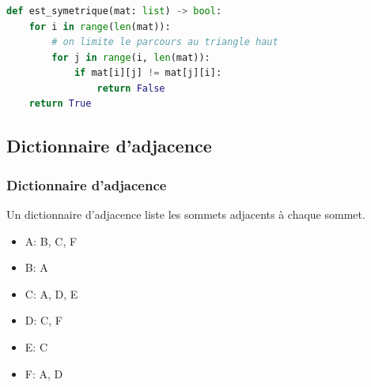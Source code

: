 \documentclass[svgnames,11pt]{beamer}
\begin{document}
\begin{frame}[fragile]
    \frametitle{}

\begin{center}
\begin{lstlisting}[language=Python , basicstyle=\ttfamily\small, xleftmargin=1em, xrightmargin=1em]
def est_symetrique(mat: list) -> bool:
    for i in range(len(mat)):
        # on limite le parcours au triangle haut
        for j in range(i, len(mat)):
            if mat[i][j] != mat[j][i]:
                return False
    return True
\end{lstlisting}
\end{center}

\end{frame}
\subsection{Dictionnaire d'adjacence}
\begin{frame}
    \frametitle{Dictionnaire d'adjacence}
    \begin{aretenir}[]
        Un dictionnaire d'adjacence liste les sommets adjacents à chaque sommet.
    \end{aretenir}
    \begin{center}
    \end{center}
    \begin{itemize}
        \item A: B, C, F
        \item B: A
        \item C: A, D, E
        \item D: C, F
        \item E: C
        \item F: A, D
    \end{itemize}

\end{frame}
\end{document}
